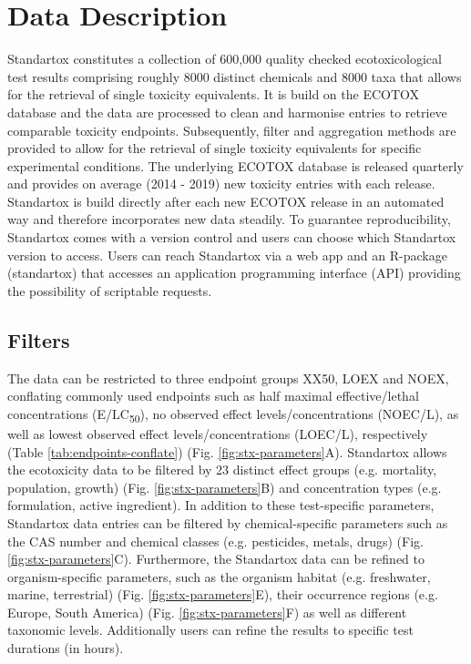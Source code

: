 \section{Data Description}
Standartox constitutes a collection of 600,000 quality checked ecotoxicological test results comprising roughly 8000 distinct chemicals and 8000 taxa that allows for the retrieval of single toxicity equivalents. It is build on the ECOTOX database \citep{usepa_ecotox_2019} and the data are processed to clean and harmonise entries to retrieve comparable toxicity endpoints. Subsequently, filter and aggregation methods are provided to allow for the retrieval of single toxicity equivalents for specific experimental conditions. The underlying ECOTOX database is released quarterly and provides on average  (2014 - 2019) new toxicity entries with each release. Standartox is build directly after each new ECOTOX release in an automated way and therefore incorporates new data steadily. To guarantee reproducibility, Standartox comes with a version control and users can choose which Standartox version to access. Users can reach Standartox via a web app and an R-package (standartox) that accesses an application programming interface (API) providing the possibility of scriptable requests.

\subsection{Filters}
The data can be restricted to three endpoint groups XX50, LOEX and NOEX, conflating commonly used endpoints such as half maximal effective/lethal concentrations (E/LC\textsubscript{50}), no observed effect levels/concentrations (NOEC/L), as well as lowest observed effect levels/concentrations (LOEC/L), respectively (Table \ref{tab:endpoints-conflate}) (Fig. \ref{fig:stx-parameters}A). Standartox allows the ecotoxicity data to be filtered by 23 distinct effect groups (e.g. mortality, population, growth) (Fig. \ref{fig:stx-parameters}B) and concentration types (e.g. formulation, active ingredient). In addition to these test-specific parameters, Standartox data entries can be filtered by chemical-specific parameters such as the CAS number and chemical classes (e.g. pesticides, metals, drugs) (Fig. \ref{fig:stx-parameters}C). Furthermore, the Standartox data can be refined to organism-specific parameters, such as the organism habitat (e.g. freshwater, marine, terrestrial) (Fig. \ref{fig:stx-parameters}E), their occurrence regions (e.g. Europe, South America) (Fig. \ref{fig:stx-parameters}F) as well as different taxonomic levels. Additionally users can refine the results to specific test durations (in hours).

